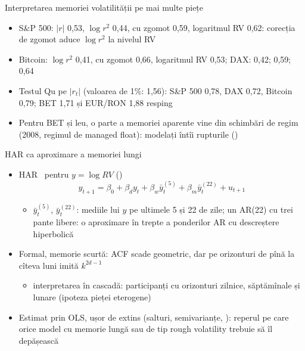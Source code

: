 \begin{frame}{Interpretarea memoriei volatilității pe mai multe piețe}
\itemsize{\small}
\begin{itemize}
    \item S\&P 500: $|r|$ 0{,}53, $\log r^2$ 0{,}44, cu zgomot 0{,}59, logaritmul RV 0{,}62: corecția de zgomot aduce $\log r^2$ la nivelul RV
    \item Bitcoin: $\log r^2$ 0{,}41, cu zgomot 0{,}66, logaritmul RV 0{,}53; DAX: 0{,}42; 0{,}59; 0{,}64
    \item Testul Qu pe $|r_t|$ (valoarea de 1\%: 1{,}56): S\&P 500 0{,}78, DAX 0{,}72, Bitcoin 0{,}79; BET 1{,}71 și EUR/RON 1{,}88 resping
    \item Pentru BET și leu, o parte a memoriei aparente vine din schimbări de regim (2008, regimul de managed float): modelați întîi rupturile ()
\end{itemize}
\end{frame}

\begin{frame}{HAR ca aproximare a memoriei lungi}
\itemsize{\small}
\begin{itemize}
    \item HAR \ pentru $y = \log RV$ ()
    \[ y_{t+1} = \beta_0 + \beta_dy_t + \beta_w\bar y_t^{(5)} + \beta_m\bar y_t^{(22)} + u_{t+1} \]
    \begin{itemize}
        \item $\bar y_t^{(5)}$, $\bar y_t^{(22)}$: mediile lui $y$ pe ultimele 5 și 22 de zile; un AR(22) cu trei pante libere: o aproximare în trepte a ponderilor AR cu descreștere hiperbolică
    \end{itemize}
    \item Formal, memorie scurtă: ACF scade geometric, dar pe orizonturi de pînă la cîteva luni imită $k^{2d-1}$
    \begin{itemize}
        \item interpretarea în cascadă: participanți cu orizonturi zilnice, săptămînale și lunare (ipoteza pieței eterogene)
    \end{itemize}
    \item Estimat prin OLS, ușor de extins (salturi, semivarianțe, ): reperul pe care orice model cu memorie lungă sau de tip rough volatility trebuie să îl depășească
\end{itemize}
\end{frame}

